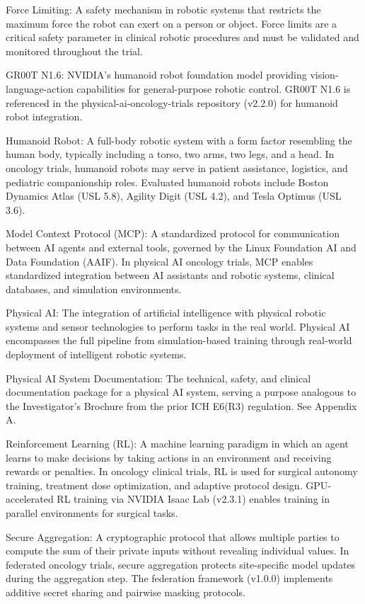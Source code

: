 Force Limiting: A safety mechanism in robotic systems that restricts the maximum force the robot can exert on a person or object. Force limits are a critical safety parameter in clinical robotic procedures and must be validated and monitored throughout the trial.

GR00T N1.6: NVIDIA's humanoid robot foundation model providing vision-language-action capabilities for general-purpose robotic control. GR00T N1.6 is referenced in the physical-ai-oncology-trials repository (v2.2.0) for humanoid robot integration.

Humanoid Robot: A full-body robotic system with a form factor resembling the human body, typically including a torso, two arms, two legs, and a head. In oncology trials, humanoid robots may serve in patient assistance, logistics, and pediatric companionship roles. Evaluated humanoid robots include Boston Dynamics Atlas (USL 5.8), Agility Digit (USL 4.2), and Tesla Optimus (USL 3.6).

Model Context Protocol (MCP): A standardized protocol for communication between AI agents and external tools, governed by the Linux Foundation AI and Data Foundation (AAIF). In physical AI oncology trials, MCP enables standardized integration between AI assistants and robotic systems, clinical databases, and simulation environments.

Physical AI: The integration of artificial intelligence with physical robotic systems and sensor technologies to perform tasks in the real world. Physical AI encompasses the full pipeline from simulation-based training through real-world deployment of intelligent robotic systems.

Physical AI System Documentation: The technical, safety, and clinical documentation package for a physical AI system, serving a purpose analogous to the Investigator's Brochure from the prior ICH E6(R3) regulation. See Appendix A.

Reinforcement Learning (RL): A machine learning paradigm in which an agent learns to make decisions by taking actions in an environment and receiving rewards or penalties. In oncology clinical trials, RL is used for surgical autonomy training, treatment dose optimization, and adaptive protocol design. GPU-accelerated RL training via NVIDIA Isaac Lab (v2.3.1) enables training in parallel environments for surgical tasks.

Secure Aggregation: A cryptographic protocol that allows multiple parties to compute the sum of their private inputs without revealing individual values. In federated oncology trials, secure aggregation protects site-specific model updates during the aggregation step. The federation framework (v1.0.0) implements additive secret sharing and pairwise masking protocols.

